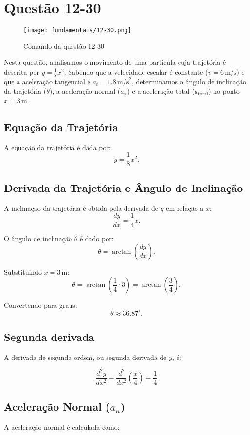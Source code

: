 \newpage
\section{Questão 12-30}

\begin{figure}[H]
	\centering
	\texttt{[image: fundamentais/12-30.png]}
	\caption{Comando da questão 12-30}\label{fig:q12-30}
\end{figure}

Nesta questão, analisamos o movimento de uma partícula cuja trajetória é descrita por \(y = \frac{1}{8}x^2\). Sabendo que a velocidade escalar é constante (\(v = 6 \, \text{m/s}\)) e que a aceleração tangencial é \(a_t = 1.8 \, \text{m/s}^2\), determinamos o ângulo de inclinação da trajetória (\(\theta\)), a aceleração normal (\(a_n\)) e a aceleração total (\(a_{\text{total}}\)) no ponto \(x = 3 \, \text{m}\).

\subsection*{Equação da Trajetória}
A equação da trajetória é dada por:
\[
y = \frac{1}{8}x^2.
\]

\subsection*{Derivada da Trajetória e Ângulo de Inclinação}
A inclinação da trajetória é obtida pela derivada de \(y\) em relação a \(x\):
\[
\frac{dy}{dx} = \frac{1}{4}x.
\]

O ângulo de inclinação \(\theta\) é dado por:
\[
\theta = \arctan\left(\frac{dy}{dx}\right).
\]

Substituindo \(x = 3 \, \text{m}\):
\[
\theta = \arctan\left(\frac{1}{4} \cdot 3\right) = \arctan\left(\frac{3}{4}\right).
\]

Convertendo para graus:
\[
\theta \approx 36.87^\circ.
\]

\subsection*{Segunda derivada}
A derivada de segunda ordem, ou segunda derivada de \(y\), é:

\[\frac{d^2y}{dx^2} = \frac{d^2}{dx^2}\left(\frac{x}{4}\right) = \frac{1}{4} \]

\subsection*{Aceleração Normal (\(a_n\))}
A aceleração normal é calculada como:

